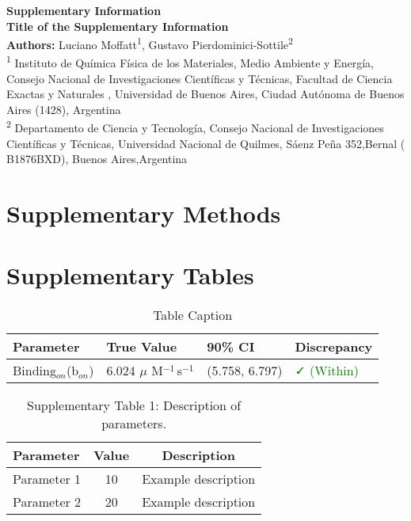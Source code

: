 \documentclass[12pt]{article}
\begin{document}
\begin{center}
\Large\textbf{Supplementary Information}\\[1em]
\normalsize
\textbf{Title of the Supplementary Information}\\[1em]
\textbf{Authors:} Luciano Moffatt\textsuperscript{1}, Gustavo Pierdominici-Sottile\textsuperscript{2}\\[1em]
\small
\textsuperscript{1} Instituto de Qu\'{i}mica F\'{i}sica de los Materiales, Medio Ambiente y Energ\'{i}a, Consejo Nacional de Investigaciones Científicas y T\'{e}cnicas, Facultad de Ciencia Exactas y Naturales , Universidad de Buenos Aires, Ciudad Aut\'{o}noma de Buenos Aires (1428), Argentina\\
\textsuperscript{2} Departamento de Ciencia y Tecnolog\'{i}a, 
Consejo Nacional de Investigaciones Científicas y T\'{e}cnicas,  Universidad Nacional de Quilmes, S\'{a}enz Pe\~{n}a 352,Bernal ( B1876BXD), Buenos Aires,Argentina\\

\end{center}

\section*{Supplementary Methods}
\label{sec:supp-methods}
\lipsum[1] %

\section*{Supplementary Tables}
\label{sec:supp-tables}
\begin{table}[
	htbp
	]
	\centering
	\caption{Table Caption}\label{tab:example}
	\begin{tabular}{@{}llll@{}}
		\hline
		Parameter & True Value & 90\% CI & Discrepancy \\
		\hline
		Binding$_{on}$(b$_{on}$) & 6.024 $\mu$ M$^{-1}$\,s$^{-1}$ & (5.758, 6.797) & \textcolor{green}{✓ (Within)} \\
		\hline
	\end{tabular}
\end{table}


\begin{table}[H]
\centering
\caption{Supplementary Table 1: Description of parameters.}
\begin{tabular}{lcc}
\hline
Parameter & Value & Description \\
\hline
Parameter 1 & 10 & Example description \\
Parameter 2 & 20 & Example description \\
\hline
\end{tabular}
\end{table}
\end{document}
